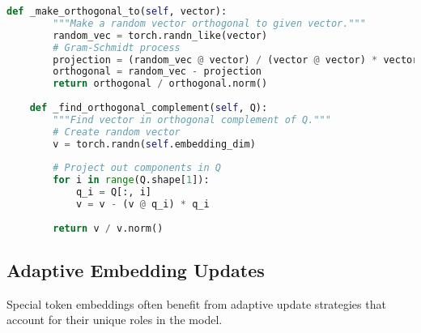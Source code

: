 \begin{lstlisting}[language=Python, caption=Advanced initialization strategies for special token embeddings]
    def _make_orthogonal_to(self, vector):
        """Make a random vector orthogonal to given vector."""
        random_vec = torch.randn_like(vector)
        # Gram-Schmidt process
        projection = (random_vec @ vector) / (vector @ vector) * vector
        orthogonal = random_vec - projection
        return orthogonal / orthogonal.norm()
        
    def _find_orthogonal_complement(self, Q):
        """Find vector in orthogonal complement of Q."""
        # Create random vector
        v = torch.randn(self.embedding_dim)
        
        # Project out components in Q
        for i in range(Q.shape[1]):
            q_i = Q[:, i]
            v = v - (v @ q_i) * q_i
            
        return v / v.norm()
\end{lstlisting}

\subsection{Adaptive Embedding Updates}

Special token embeddings often benefit from adaptive update strategies that account for their unique roles in the model.

